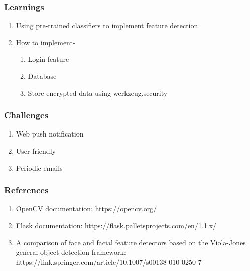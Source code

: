 \documentclass[14pt]{beamer}
\begin{document}
\begin{frame}
    \frametitle{Learnings}
    \begin{enumerate}
        \item Using pre-trained classifiers to implement feature detection
        \item How to implement-
        \begin{enumerate}
            \item Login feature
            \item Database
            \item Store encrypted data using werkzeug.security
        \end{enumerate}
    \end{enumerate}
\end{frame}
\begin{frame}
    \frametitle{Challenges}
    \begin{enumerate}
        \item Web push notification
        \item User-friendly
        \item Periodic emails
    \end{enumerate}
\end{frame}

\begin{frame}
    \frametitle{References}
    \begin{enumerate}
        \item OpenCV documentation: 
        https://opencv.org/
        \item Flask documentation: 
        https://flask.palletsprojects.com/en/1.1.x/
        \item A comparison of face and facial feature detectors based on the Viola-Jones general object detection framework: 
        https://link.springer.com/article/10.1007/s00138-010-0250-7
    \end{enumerate}
\end{frame}
\end{document}

